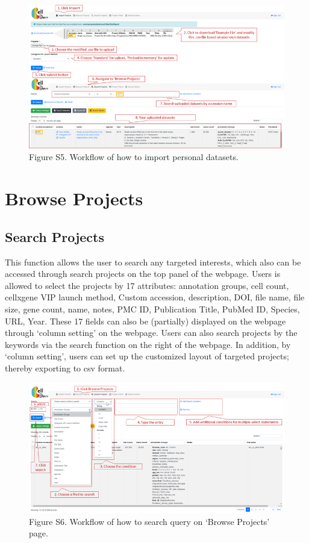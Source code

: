 \documentclass[
]{book}
\begin{document}
\begin{figure}
\centering
\includegraphics{figures/S5.png}
\caption{Figure S5. Workflow of how to import personal datasets.}
\end{figure}

\hypertarget{browse-projects}{%
\section{Browse Projects}\label{browse-projects}}

\hypertarget{search-projects}{%
\subsection{Search Projects}\label{search-projects}}

This function allows the user to search any targeted interests, which also can be accessed through search projects on the top panel of the webpage. Users is allowed to select the projects by 17 attributes: annotation groups, cell count, cellxgene VIP launch method, Custom accession, description, DOI, file name, file size, gene count, name, notes, PMC ID, Publication Title, PubMed ID, Species, URL, Year. These 17 fields can also be (partially) displayed on the webpage through `column setting' on the webpage. Users can also search projects by the keywords via the search function on the right of the webpage. In addition, by `column setting', users can set up the customized layout of targeted projects; thereby exporting to csv format.

\begin{figure}
\centering
\includegraphics{figures/S6.png}
\caption{Figure S6. Workflow of how to search query on `Browse Projects' page.}
\end{figure}
\end{document}
